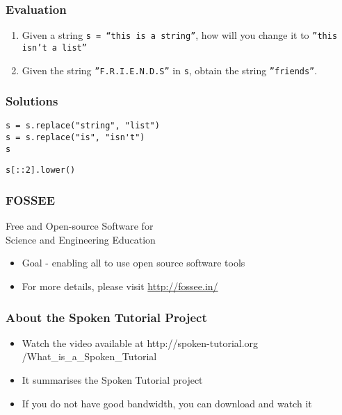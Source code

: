 \documentclass[17pt,compress]{beamer}
\begin{document}
\begin{frame}
\frametitle{Evaluation}
\label{sec-10}


\begin{enumerate}
\item Given a string \texttt{s = ``this is a string''}, how will you change it
   to \texttt{''this isn't a list''}\pause
\vspace{12pt}   
\item Given the string \texttt{''F.R.I.E.N.D.S''} in \texttt{s}, obtain the string \texttt{''friends''}.
\end{enumerate}
\end{frame}
\begin{frame}[fragile]
\frametitle{Solutions}
\label{sec-11}


\begin{enumerate}
\begin{small}
\item \lstset{language=Python}
\begin{lstlisting}
s = s.replace("string", "list")
s = s.replace("is", "isn't")
s
\end{lstlisting}\pause
\vspace{8pt}
\item \texttt{s[::2].lower()}
\end{small}
\end{enumerate}
\end{frame}
\begin{frame}
\frametitle{FOSSEE}
{\color{blue}Free and Open-source Software for \\Science and Engineering Education} \\
\begin{itemize}
\item Goal - enabling all to use open source software tools
\item For more details, please visit {\color{blue}\url{http://fossee.in/}}
\end{itemize}
\end{frame}
\begin{frame}
\frametitle{About the Spoken Tutorial Project}
\begin{itemize}
\item Watch the video available at {\color{blue}http://spoken-tutorial.org /What\_is\_a\_Spoken\_Tutorial}
\item It summarises the Spoken Tutorial project \pause
\item If you do not have good bandwidth, you can download and watch it
\end{itemize}
\end{frame}
\end{document}
